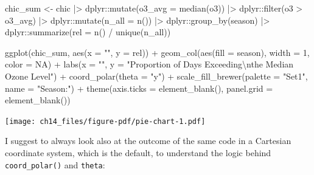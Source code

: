 \documentclass[
  letterpaper,
]{scrbook}
\newenvironment{Shaded}{\begin{snugshade}}{\end{snugshade}}
\newcommand{\AttributeTok}[1]{\textcolor[rgb]{0.40,0.45,0.13}{#1}}
\newcommand{\ConstantTok}[1]{\textcolor[rgb]{0.56,0.35,0.01}{#1}}
\newcommand{\DecValTok}[1]{\textcolor[rgb]{0.68,0.00,0.00}{#1}}
\newcommand{\FunctionTok}[1]{\textcolor[rgb]{0.28,0.35,0.67}{#1}}
\newcommand{\NormalTok}[1]{\textcolor[rgb]{0.00,0.23,0.31}{#1}}
\newcommand{\OtherTok}[1]{\textcolor[rgb]{0.00,0.23,0.31}{#1}}
\newcommand{\SpecialCharTok}[1]{\textcolor[rgb]{0.37,0.37,0.37}{#1}}
\newcommand{\StringTok}[1]{\textcolor[rgb]{0.13,0.47,0.30}{#1}}
\begin{document}
\begin{Shaded}
\begin{Highlighting}[]
\NormalTok{chic\_sum }\OtherTok{\textless{}{-}}
\NormalTok{  chic }\SpecialCharTok{|\textgreater{}}
\NormalTok{  dplyr}\SpecialCharTok{::}\FunctionTok{mutate}\NormalTok{(}\AttributeTok{o3\_avg =} \FunctionTok{median}\NormalTok{(o3)) }\SpecialCharTok{|\textgreater{}}
\NormalTok{  dplyr}\SpecialCharTok{::}\FunctionTok{filter}\NormalTok{(o3 }\SpecialCharTok{\textgreater{}}\NormalTok{ o3\_avg) }\SpecialCharTok{|\textgreater{}}
\NormalTok{  dplyr}\SpecialCharTok{::}\FunctionTok{mutate}\NormalTok{(}\AttributeTok{n\_all =} \FunctionTok{n}\NormalTok{()) }\SpecialCharTok{|\textgreater{}}
\NormalTok{  dplyr}\SpecialCharTok{::}\FunctionTok{group\_by}\NormalTok{(season) }\SpecialCharTok{|\textgreater{}}
\NormalTok{  dplyr}\SpecialCharTok{::}\FunctionTok{summarize}\NormalTok{(}\AttributeTok{rel =} \FunctionTok{n}\NormalTok{() }\SpecialCharTok{/} \FunctionTok{unique}\NormalTok{(n\_all))}

\FunctionTok{ggplot}\NormalTok{(chic\_sum, }\FunctionTok{aes}\NormalTok{(}\AttributeTok{x =} \StringTok{""}\NormalTok{, }\AttributeTok{y =}\NormalTok{ rel)) }\SpecialCharTok{+}
  \FunctionTok{geom\_col}\NormalTok{(}\FunctionTok{aes}\NormalTok{(}\AttributeTok{fill =}\NormalTok{ season), }\AttributeTok{width =} \DecValTok{1}\NormalTok{, }\AttributeTok{color =} \ConstantTok{NA}\NormalTok{) }\SpecialCharTok{+}
  \FunctionTok{labs}\NormalTok{(}\AttributeTok{x =} \StringTok{""}\NormalTok{, }\AttributeTok{y =} \StringTok{"Proportion of Days Exceeding}\SpecialCharTok{\textbackslash{}n}\StringTok{the Median Ozone Level"}\NormalTok{) }\SpecialCharTok{+}
  \FunctionTok{coord\_polar}\NormalTok{(}\AttributeTok{theta =} \StringTok{"y"}\NormalTok{) }\SpecialCharTok{+}
  \FunctionTok{scale\_fill\_brewer}\NormalTok{(}\AttributeTok{palette =} \StringTok{"Set1"}\NormalTok{, }\AttributeTok{name =} \StringTok{"Season:"}\NormalTok{) }\SpecialCharTok{+}
  \FunctionTok{theme}\NormalTok{(}\AttributeTok{axis.ticks =} \FunctionTok{element\_blank}\NormalTok{(),}
        \AttributeTok{panel.grid =} \FunctionTok{element\_blank}\NormalTok{())}
\end{Highlighting}
\end{Shaded}

\texttt{[image: ch14\_files/figure-pdf/pie-chart-1.pdf]}

I suggest to always look also at the outcome of the same code in a
Cartesian coordinate system, which is the default, to understand the
logic behind \texttt{coord\_polar()} and \texttt{theta}:
\end{document}

